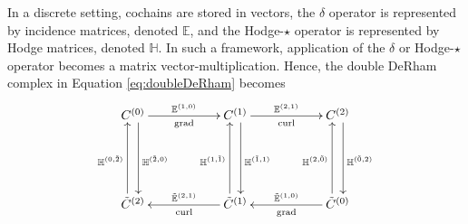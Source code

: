 In a discrete setting, cochains are stored in vectors, the $\delta$ operator is represented by incidence matrices, denoted $\mathbb{E}$, and the Hodge-$\star$ operator is represented by Hodge matrices, denoted $\mathbb{H}$. In such a framework, application of the $\delta$ or Hodge-$\star$ operator becomes a matrix vector-multiplication. Hence, the double DeRham complex in Equation \eqref{eq:doubleDeRham} becomes
\begin{equation}
    \begin{gathered}
        \xymatrix@=13ex{
            C^{(0)} \ar[r]^{\mathbb{E}^{(1,0)}}_{\text{grad}} \ar@<1ex>[d]^{\mathbb{H}^{(\tilde{2},0)}} & C^{(1)} \ar[r]^{\mathbb{E}^{(2,1)}}_{\text{curl}} \ar@<1ex>[d]^{\mathbb{H}^{(\tilde{1},1)}} & C^{(2)} \ar@<1ex>[d]^{\mathbb{H}^{(\tilde{0},2)}} \\
            \tilde{C}^{(2)} \ar@<1ex>[u]^{\mathbb{H}^{(0,\tilde{2})}} & \tilde{C}^{(1)} \ar[l]_{\tilde{\mathbb{E}}^{(2, 1)}}^{\text{curl}} \ar@<1ex>[u]^{\mathbb{H}^{(1,\tilde{1})}} & \tilde{C}^{(0)} \ar[l]_{\tilde{\mathbb{E}}^{(1,0)}}^{\text{grad}} \ar@<1ex>[u]^{\mathbb{H}^{(2,\tilde{0})}}
        }
    \end{gathered}
\end{equation}
